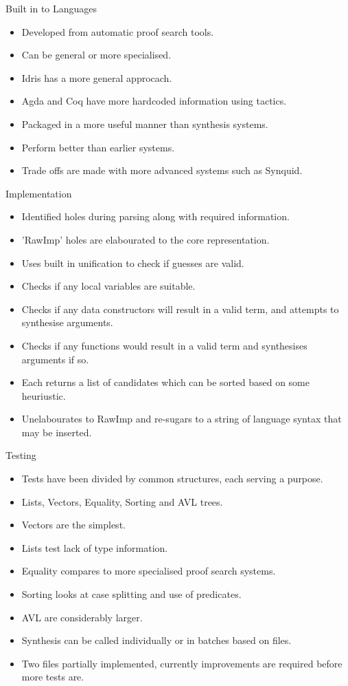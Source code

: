 \documentclass[presentation]{beamer}
\begin{document}
\begin{frame}[fragile]{Built in to Languages}
  \begin{itemize}
  \item Developed from automatic proof search tools.
  \item Can be general or more specialised.
  \item Idris has a more general approcach.
  \item Agda and Coq have more hardcoded information using tactics.
  \item Packaged in a more useful manner than synthesis systems.
  \item Perform better than earlier systems.
  \item Trade offs are made with more advanced systems such as Synquid.
  \end{itemize}
\end{frame}
\begin{frame}[fragile]{Implementation}
  \begin{itemize}
  \item Identified holes during parsing along with required information.
  \item 'RawImp' holes are elabourated to the core representation.
  \item Uses built in unification to check if guesses are valid.
  \item Checks if any local variables are suitable.
  \item Checks if any data constructors will
    result in a valid term, and attempts to synthesise arguments.
  \item Checks if any functions would result in a valid term and
    synthesises arguments if so.
  \item Each returns a list of candidates which can be sorted based on some
    heuriustic.
  \item Unelabourates to RawImp and re-sugars to a string of
    language syntax that may be inserted.
  \end{itemize}
\end{frame}

\begin{frame}[fragile]{Testing}
  \begin{itemize}
  \item Tests have been divided by common structures,
    each serving a purpose.
  \item Lists, Vectors, Equality, Sorting and AVL trees.
  \item Vectors are the simplest.
  \item Lists test lack of type information.
  \item Equality compares to more specialised proof search systems.
  \item Sorting looks at case splitting and use of predicates.
  \item AVL are considerably larger.
  \item Synthesis can be called individually or in batches based
    on files.
  \item Two files partially implemented, currently improvements
    are required before more tests are.
  \end{itemize}
\end{frame}
\end{document}
